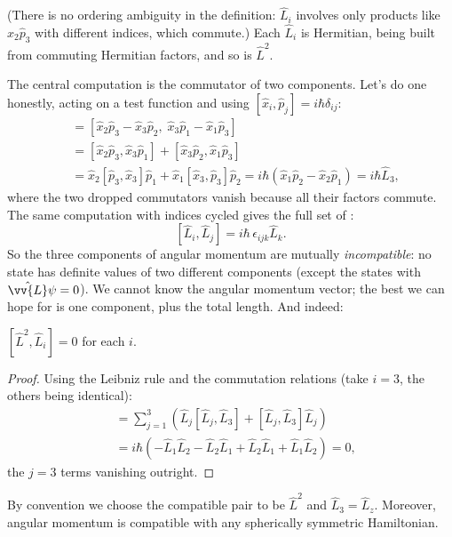 (There is no ordering ambiguity in the definition: $\hat L_i$ involves only products like $\hat{x}_2 \hat{p}_3$ with different indices, which commute.) Each $\hat{L}_i$ is Hermitian, being built from commuting Hermitian factors, and so is $\hat{L}^2$.

The central computation is the commutator of two components. Let's do one honestly, acting on a test function and using $[\hat x_i, \hat p_j] = i\hbar\delta_{ij}$:
\begin{align*}
    [\hat{L}_1, \hat{L}_2] &= [\hat{x}_2 \hat{p}_3 - \hat{x}_3 \hat{p}_2, \; \hat{x}_3 \hat{p}_1 - \hat{x}_1 \hat{p}_3] \\
    &= [\hat{x}_2 \hat{p}_3, \hat{x}_3 \hat{p}_1] + [\hat x_3 \hat p_2, \hat x_1 \hat p_3] \\
    &= \hat{x}_2 [\hat{p}_3, \hat{x}_3] \hat{p}_1 + \hat{x}_1 [\hat{x}_3, \hat{p}_3] \hat{p}_2
    = i \hbar ( \hat{x}_1 \hat{p}_2 - \hat{x}_2 \hat{p}_1 ) = i \hbar \hat{L}_3,
\end{align*}
where the two dropped commutators vanish because all their factors commute. The same computation with indices cycled gives the full set of :
$$
[\hat{L}_i, \hat{L}_j] = i \hbar \, \epsilon_{ijk} \hat{L}_k.
$$
So the three components of angular momentum are mutually \emph{incompatible}: no state has definite values of two different components (except the states with $\hat{\vv{L}}\psi = 0$). We cannot know the angular momentum vector; the best we can hope for is one component, plus the total length. And indeed:

\begin{proposition}
    $[\hat{L}^2, \hat{L}_i] = 0$ for each $i$.
\end{proposition}
\begin{proof}
    Using the Leibniz rule and the commutation relations (take $i = 3$, the others being identical):
    \begin{align*}
        [\hat{L}^2, \hat{L}_3] &= \sum_{j=1}^3 \left( \hat{L}_j [\hat{L}_j, \hat{L}_3] + [\hat{L}_j, \hat{L}_3]\hat{L}_j \right)\\
        &= i\hbar\left( -\hat{L}_1 \hat{L}_2 - \hat{L}_2 \hat{L}_1 + \hat{L}_2 \hat{L}_1 + \hat{L}_1 \hat{L}_2 \right) = 0,
    \end{align*}
    the $j = 3$ terms vanishing outright.
\end{proof}

By convention we choose the compatible pair to be $\hat{L}^2$ and $\hat{L}_3 = \hat{L}_z$. Moreover, angular momentum is compatible with any spherically symmetric Hamiltonian.

